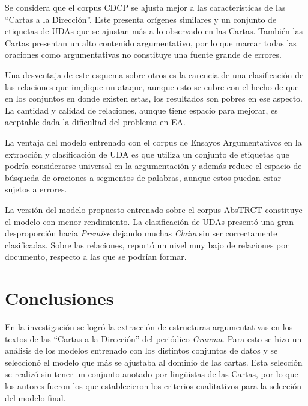 \documentclass{rcci} %
\begin{document}
Se considera que el corpus CDCP se ajusta mejor a las caracter\'isticas de las ``Cartas 
a la Direcci\'on''. Este presenta or\'igenes similares y un conjunto de etiquetas de UDAs que se ajustan m\'as a lo observado 
en las Cartas. Tambi\'en las Cartas presentan un alto contenido argumentativo, por lo que marcar 
todas las oraciones como argumentativas no constituye una fuente grande de errores.

Una desventaja de este esquema sobre otros es la carencia de una 
clasificaci\'on de las relaciones que implique un ataque, aunque esto se cubre con el hecho de 
que en los conjuntos en donde existen estas, los resultados son pobres en ese aspecto. La cantidad 
y calidad de relaciones, aunque tiene espacio para mejorar, es aceptable dada la dificultad 
del problema en EA.

La ventaja del modelo entrenado con el corpus de Ensayos Argumentativos en la extracci\'on 
y clasificaci\'on de UDA es que utiliza un conjunto de etiquetas que 
podr\'ia considerarse universal en la argumentaci\'on y adem\'as reduce el espacio de b\'usqueda de 
oraciones a segmentos de palabras, aunque estos puedan estar sujetos a errores. 

La versi\'on del modelo propuesto entrenado sobre el corpus AbsTRCT constituye el modelo 
con menor rendimiento. La clasificaci\'on
de UDAs present\'o una gran desproporci\'on hacia \textit{Premise} dejando muchas \textit{Claim} %
sin ser correctamente clasificadas. Sobre las relaciones, report\'o un nivel muy bajo de 
relaciones por documento, respecto a las que se podr\'ian formar.

\section*{Conclusiones}



En la investigaci\'on se logr\'o la extracci\'on de estructuras argumentativas en los textos de las 
``Cartas a la Direcci\'on'' del peri\'odico \textit{Granma}. Para esto se hizo un an\'alisis de los
modelos entrenado con los distintos conjuntos de datos y se seleccion\'o el modelo que m\'as se ajustaba
al dominio de las cartas. Esta
selecci\'on se realiz\'o sin tener un conjunto anotado por ling\"uistas de las Cartas,
por lo que los autores fueron los que establecieron los criterios cualitativos 
para la selecci\'on del modelo final.
\end{document}

